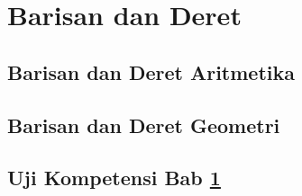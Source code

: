 \chapter{Barisan dan Deret}
\label{sec:fifth}

\section{Barisan dan Deret Aritmetika}
\kant[1-5]

\section{Barisan dan Deret Geometri}
\kant[6-10]

\section{Uji Kompetensi Bab \ref{sec:fifth}}
\kant[11-15]
